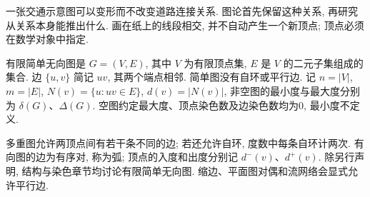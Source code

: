 \label{ch:basic}
一张交通示意图可以变形而不改变道路连接关系. 图论首先保留这种关系, 再研究从关系本身能推出什么. 画在纸上的线段相交, 并不自动产生一个新顶点; 顶点必须在数学对象中指定.
\begin{definition}
有限简单无向图是 $G=(V,E)$, 其中 $V$ 为有限顶点集, $E$ 是 $V$ 的二元子集组成的集合. 边 $\{u,v\}$ 简记 $uv$, 其两个端点相邻. 简单图没有自环或平行边. 记 $n=|V|$, $m=|E|$, $N(v)=\{u:uv\in E\}$, $d(v)=|N(v)|$, 非空图的最小度与最大度分别为 $\delta(G)$、$\Delta(G)$. 空图约定最大度、顶点染色数及边染色数均为0, 最小度不定义.
\end{definition}
多重图允许两顶点间有若干条不同的边; 若还允许自环, 度数中每条自环计两次. 有向图的边为有序对, 称为弧; 顶点的入度和出度分别记 $d^-(v)$、$d^+(v)$. 除另行声明, 结构与染色章节均讨论有限简单无向图. 缩边、平面图对偶和流网络会显式允许平行边.

